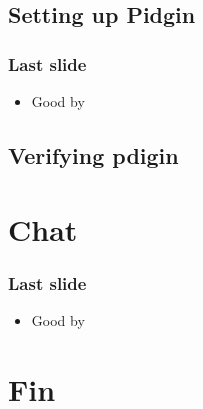\documentclass{beamer}
\begin{document}
\subsection{Setting up Pidgin}
\begin{frame}
\frametitle{Last slide}
\begin{itemize}
\item Good by
\end{itemize}
\end{frame}
\subsection{Verifying pdigin}
\section{Chat}
\begin{frame}
\frametitle{Last slide}
\begin{itemize}
\item Good by
\end{itemize}
\end{frame}
\section{Fin}
\end{document}
